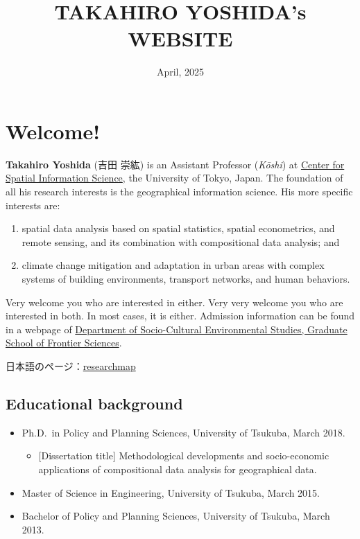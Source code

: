 \documentclass[
]{book}
\title{TAKAHIRO YOSHIDA's WEBSITE}
\author{}
\date{\vspace{-2.5em}April, 2025}
\providecommand{\tightlist}{%
  \setlength{\itemsep}{0pt}\setlength{\parskip}{0pt}}
\begin{document}
\maketitle

{
\setcounter{tocdepth}{1}
\tableofcontents
}
\chapter*{Welcome!}\label{welcome}

\textbf{Takahiro Yoshida} (吉田 崇紘) is an Assistant Professor (\emph{Kōshi}) at \href{https://www.csis.u-tokyo.ac.jp/}{Center for Spatial Information Science}, the University of Tokyo, Japan. The foundation of all his research interests is the geographical information science. His more specific interests are:

\begin{enumerate}
\def\labelenumi{(\arabic{enumi})}
\tightlist
\item
  spatial data analysis based on spatial statistics, spatial econometrics, and remote sensing, and its combination with compositional data analysis; and
\item
  climate change mitigation and adaptation in urban areas with complex systems of building environments, transport networks, and human behaviors.
\end{enumerate}

Very welcome you who are interested in either. Very very welcome you who are interested in both. In most cases, it is either. Admission information can be found in a webpage of \href{https://sbk.k.u-tokyo.ac.jp/index_e.html}{Department of Socio-Cultural Environmental Studies, Graduate School of Frontier Sciences}.

日本語のページ：\href{https://researchmap.jp/yoshida.takahiro}{researchmap}

\section*{Educational background}\label{educational-background}

\begin{itemize}
\tightlist
\item
  Ph.D.~in Policy and Planning Sciences, University of Tsukuba, March 2018.

  \begin{itemize}
  \tightlist
  \item
    {[}Dissertation title{]} Methodological developments and socio-economic applications of compositional data analysis for geographical data.
  \end{itemize}
\item
  Master of Science in Engineering, University of Tsukuba, March 2015.
\item
  Bachelor of Policy and Planning Sciences, University of Tsukuba, March 2013.
\end{itemize}
\end{document}
